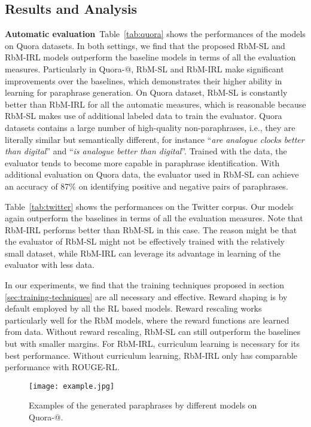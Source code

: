 \documentclass[11pt,a4paper]{article}
\makeatletter
\newcommand{\Rmnum}[1]{\expandafter\@slowromancap\romannumeral #1@}
\makeatother
\begin{document}
    \subsection{Results and Analysis}
    \noindent \textbf{Automatic evaluation}\  Table~\ref{tab:quora} shows the performances of the models on Quora datasets. In both settings, we find that the proposed RbM-SL and RbM-IRL models outperform the baseline models in terms of all the evaluation measures. Particularly in Quora-\Rmnum{2}, RbM-SL and RbM-IRL make significant improvements over the baselines, which demonstrates their higher ability in learning for paraphrase generation. On Quora dataset, RbM-SL is constantly better than RbM-IRL for all the automatic measures, which is reasonable because RbM-SL makes use of additional labeled data to train the evaluator. Quora datasets contains a large number of high-quality non-paraphrases, i.e., they are literally similar but semantically different, for instance ``\textit{are analogue clocks better than digital}'' and ``\textit{is analogue better than digital}''. Trained with the data, the evaluator tends to become more capable in paraphrase identification. With additional evaluation on Quora data, the evaluator used in RbM-SL can achieve an accuracy of 87\% on identifying positive and negative pairs of paraphrases.

    Table~\ref{tab:twitter} shows the performances on the Twitter corpus. Our models again outperform the baselines in terms of all the evaluation measures. Note that RbM-IRL performs better than RbM-SL in this case. The reason might be that the evaluator of RbM-SL might not be effectively trained with the relatively small dataset, while RbM-IRL can leverage its advantage in learning of the evaluator with less data.

    In our experiments, we find that the training techniques proposed in section \ref{sec:training-techniques} are all necessary and effective. Reward shaping is by default employed by all the RL based models. Reward rescaling works particularly well for the RbM models, where the reward functions are learned from data. Without reward rescaling, RbM-SL can still outperform the baselines but with smaller margins. For RbM-IRL, curriculum learning is necessary for its best performance. Without curriculum learning, RbM-IRL only has comparable performance with ROUGE-RL.

    \begin{figure*}[t!]
      \centering
      \caption{Examples of the generated paraphrases by different models on Quora-\Rmnum{2}.}\label{fig:examples}\vspace{-10pt}
      \texttt{[image: example.jpg]}\vspace{-10pt}
    \end{figure*}
\end{document}

